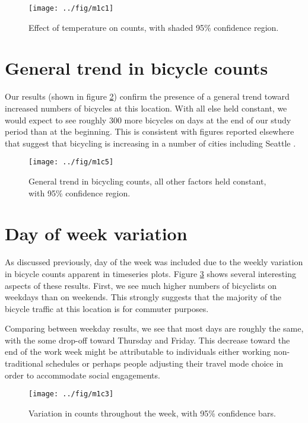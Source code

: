 \documentclass[12pt,letterpaper,article]{memoir}
\begin{document}
\begin{figure}[ht!]
  \centering
  \texttt{[image: ../fig/m1c1]}
  \caption{Effect of temperature on counts, with shaded 95\%
    confidence region.}
  \label{fg:temperature}
\end{figure}


\FloatBarrier
\section*{General trend in bicycle counts}
Our results (shown in figure \ref{fg:trend}) confirm the presence of a
general trend toward increased numbers of bicycles at this location.
With all else held constant, we would expect to see roughly 300 more
bicycles on days at the end of our study period than at the beginning.
This is consistent with figures reported elsewhere that suggest that
bicycling is increasing in a number of cities including
Seattle \parencite{League-of-American-Bicyclists:aa}.

\begin{figure}[ht!]
  \centering
  \texttt{[image: ../fig/m1c5]}
  \caption{General trend in bicycling counts, all other factors held
    constant, with 95\% confidence region.}
  \label{fg:trend}
\end{figure}


\FloatBarrier
\section*{Day of week variation}
As discussed previously, day of the week was included due to the
weekly variation in bicycle counts apparent in timeseries plots.
Figure \ref{fg:dayofweek} shows several interesting aspects of these
results. First, we see much higher numbers of bicyclists on weekdays
than on weekends. This strongly suggests that the majority of the
bicycle traffic at this location is for commuter purposes.

Comparing between weekday results, we see that most days are roughly
the same, with the some drop-off toward Thursday and Friday. This
decrease toward the end of the work week might be attributable to
individuals either working non-traditional schedules or perhaps people
adjusting their travel mode choice in order to accommodate social
engagements.

\begin{figure}[ht!]
  \centering
  \texttt{[image: ../fig/m1c3]}
  \caption{Variation in counts throughout the week, with 95\% confidence bars.}
  \label{fg:dayofweek}
\end{figure}
\end{document}
